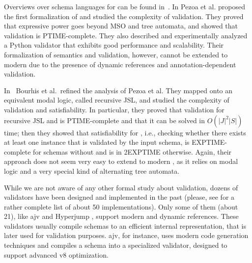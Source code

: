 Overviews over schema languages for {\json} can be found 
in~\citep{DBLP:conf/www/PezoaRSUV16,DBLP:conf/edbt/BaaziziCGS19,DBLP:conf/pods/BourhisRSV17,DBLP:conf/sigmod/BaaziziCGS19}.
In \citep{DBLP:conf/www/PezoaRSUV16} Pezoa et al. proposed the first formalization of {\cJS} {\DFour} and studied the complexity of validation. They proved that {\JS} {\DFour} expressive power goes beyond MSO and tree automata, and showed that validation is PTIME-complete. 
They also described and experimentally analyzed a Python validator that exhibits good performance and scalability. 
Their formalization of semantics and validation, however, cannot be extended to modern {\JS} due to the presence of dynamic references and annotation-dependent validation.

In~\citep{DBLP:conf/pods/BourhisRSV17} Bourhis et al.\ refined the analysis of Pezoa et al. They mapped {\cJS} onto an equivalent modal logic, called recursive JSL, and studied the complexity of validation and satisfiability. In particular, they proved that validation for recursive JSL and {\cJS} is PTIME-complete and that it can be solved in $O(|J|^{2}|S|)$ time; then they showed that satisfiability for {\cJS}, i.e., checking whether 
there exists at least one instance that is validated by the input schema,  is EXPTIME-complete for schemas without {\xuniqIt} and is in 2EXPTIME otherwise. Again, their approach does not seem very easy to extend to modern {\JS}, as it relies on modal logic and a very special kind of alternating tree automata. 

While  we are not aware of any other formal study about {\JS} validation, dozens of validators have been designed and implemented in the past (please, see \citep{vallist} for a rather complete list of about 50 implementations). Only some of them (about 21),  like ajv \citep{ajv} and Hyperjump \citep{hyperjump}, support modern {\JS} and dynamic references. These validators %
usually compile schemas to an efficient internal representation, that is later used for validation purposes. ajv, for instance, uses modern code generation techniques and compiles a schema into a specialized validator, designed to support advanced v8 optimization.


